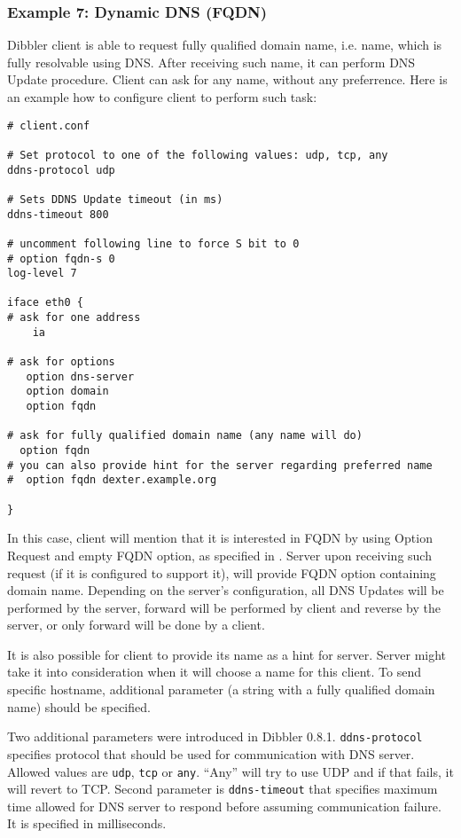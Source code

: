 \subsubsection{Example 7: Dynamic DNS (FQDN)}
\label{example-client-fqdn}
Dibbler client is able to request fully qualified domain name,
i.e. name, which is fully resolvable using DNS. After receiving such
name, it can perform DNS Update procedure. Client can ask for any
name, without any preferrence. Here is an example how to configure
client to perform such task:
\begin{lstlisting}
# client.conf

# Set protocol to one of the following values: udp, tcp, any
ddns-protocol udp

# Sets DDNS Update timeout (in ms)
ddns-timeout 800

# uncomment following line to force S bit to 0
# option fqdn-s 0
log-level 7

iface eth0 {
# ask for one address
    ia

# ask for options
   option dns-server
   option domain
   option fqdn

# ask for fully qualified domain name (any name will do)
  option fqdn
# you can also provide hint for the server regarding preferred name
#  option fqdn dexter.example.org

}
\end{lstlisting}

In this case, client will mention that it is interested in FQDN by
using Option Request and empty FQDN option, as specified in
\cite{rfc4704}. Server upon receiving such request (if it is
configured to support it), will provide FQDN option containing domain
name. Depending on the server's configuration, all DNS Updates will be
performed by the server, forward will be performed by client and reverse
by the server, or only forward will be done by a client.

It is also possible for client to provide its name as a hint for
server. Server might take it into consideration when it will choose a
name for this client. To send specific hostname, additional parameter
(a string with a fully qualified domain name) should be specified.

Two additional parameters were introduced in Dibbler
0.8.1. \verb+ddns-protocol+ specifies protocol that should be used for
communication with DNS server.  Allowed values
are \verb+udp+, \verb+tcp+ or \verb+any+. ``Any'' will try to use UDP
and if that fails, it will revert to TCP. Second parameter
is \verb+ddns-timeout+ that specifies maximum time allowed for DNS
server to respond before assuming communication failure. It is
specified in milliseconds.

